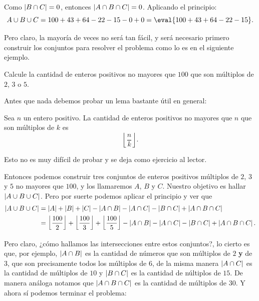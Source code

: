 Como $\left\lvert B \cap C \right\rvert = 0$, entonces $\left\lvert A \cap B \cap C \right\rvert = 0$.
Aplicando el principio:
\[A \cup B \cup C = 100 + 43 + 64 - 22 - 15 - 0 + 0 = \eval{100 + 43 + 64 - 22 - 15}.\]

Pero claro, la mayoría de veces
no será tan fácil, y será necesario
primero construir los conjuntos
para resolver el problema como
lo es en el siguiente ejemplo.
\begin{example}[No realista]
	Calcule la cantidad de
	enteros positivos no mayores que $100$
	que son múltiplos de $2$, $3$ o $5$.
\end{example}

Antes que nada debemos probar un lema
bastante útil en general:
\begin{lemma}
	Sea $n$ un entero positivo.
	La cantidad de enteros positivos
	no mayores que $n$ que son
	múltiplos de $k$ es
	\[\left\lfloor\frac nk\right\rfloor.\]
\end{lemma}
Esto no es muy difícil de probar y se deja como
ejercicio al lector.

Entonces podemos construir tres conjuntos
de enteros positivos múltiplos de $2$, $3$ y $5$
no mayores que $100$, y los llamaremos
$A$, $B$ y $C$. Nuestro objetivo es hallar
$\left\lvert A \cup B \cup C \right\rvert$.
Pero por suerte podemos aplicar el principio y
ver que
\begin{align*}
	\left\lvert A \cup B \cup C \right\rvert & = \left\lvert A \right\rvert + \left\lvert B \right\rvert + \left\lvert C \right\rvert - \left\lvert A \cap B \right\rvert - \left\lvert A \cap C \right\rvert - \left\lvert B \cap C \right\rvert + \left\lvert A \cap B \cap C \right\rvert                                                                                               \\
	                      & = \left\lfloor\frac{100}{2}\right\rfloor + \left\lfloor\frac{100}{3}\right\rfloor + \left\lfloor\frac{100}{5}\right\rfloor - \left\lvert A \cap B \right\rvert - \left\lvert A \cap C \right\rvert - \left\lvert B \cap C \right\rvert + \left\lvert A \cap B \cap C \right\rvert.
\end{align*}

Pero claro, ¿cómo hallamos las intersecciones entre estos
conjuntos?, lo cierto es que, por ejemplo, $\left\lvert A \cap B \right\rvert$
es la cantidad de números que son múltiplos de $2$
\textbf{y} de $3$, que son precisamente todos los múltiplos
de $6$, de la misma manera $\left\lvert A \cap C \right\rvert$ es
la cantidad de múltiplos de $10$ y $\left\lvert B \cap C \right\rvert$
es la cantidad de núltiplos de $15$.
De manera análoga notamos que $\left\lvert A \cap B \cap C \right\rvert$
es la cantidad de múltiplos de $30$.
Y ahora sí podemos terminar el problema:

